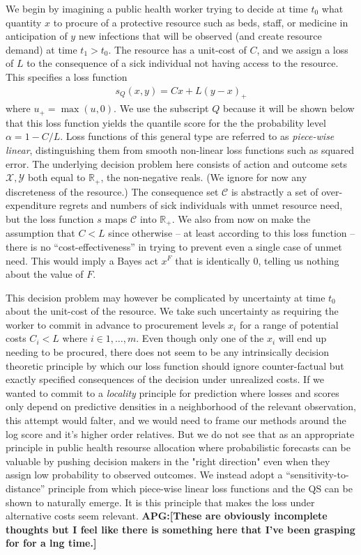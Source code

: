 \documentclass{article}
\def\apg#1{{\color{red}\textbf{APG:[#1]}}}
\begin{document}
We begin by imagining a public health worker trying to decide at time $t_0$ what quantity $x$ to procure of a protective resource such as beds, staff, or medicine in anticipation of $y$ new infections that will be observed (and create resource demand) at time $t_1>t_0$. The resource has a unit-cost of $C$, and we assign a loss of $L$ to the consequence of a sick individual not having access to the resource. This specifies a loss function  
\begin{align}
s_Q(x,y) = Cx + L(y-x)_+ \label{eqn:quantile_loss}
\end{align}
where $u_+ = \max(u,0)$.  We use the subscript $Q$ because it will be shown below that this loss function yields the quantile score for the the probability level $\alpha = 1 - C/L$.  Loss functions of this general type are referred to as \emph{piece-wise linear}, distinguishing them from smooth non-linear loss functions such as squared error.
The underlying decision problem here consists of action and outcome sets $\mathcal{X},\mathcal{Y}$ both equal to $\mathbb{R}_+$, the non-negative reals.  (We ignore for now any discreteness of the resource.) The consequence set $\mathcal{C}$ is abstractly a set of over-expenditure regrets and numbers of sick individuals with unmet resource need, but the loss function $s$ maps $\mathcal{C}$ into $\mathbb{R}_+$. We also from now on make the assumption that $C < L$ since otherwise -- at least according to this loss function -- there is no ``cost-effectiveness'' in trying to prevent even a single case of unmet need. This would imply a Bayes act $x^F$ that is identically 0, telling us nothing about the value of $F$.

This decision problem may however be complicated by uncertainty at time $t_0$ about the unit-cost of the resource. We take such uncertainty as requiring the worker to commit in advance to procurement levels $x_i$ for a range of potential costs $C_i < L$ where $i \in 1, \ldots, m$.  Even though only one of the $x_i$ will end up needing to be procured, there does not seem to be any intrinsically decision theoretic principle by which our loss function should ignore counter-factual but exactly specified consequences of the decision under unrealized costs. If we wanted to commit to a \emph{locality} principle for prediction where losses and scores only depend on predictive densities in a neighborhood of the relevant observation, this attempt would falter, and we would need to frame our methods around the log score and it's higher order relatives. But we do not see that as an appropriate principle in public health resourse allocation where  
probabilistic forecasts can be valuable by pushing decision makers in the "right direction" even when they assign low probability to observed outcomes. We instead adopt a ``sensitivity-to-distance'' principle from which piece-wise linear loss functions and the QS can be shown to naturally emerge. It is this principle that makes the loss under alternative costs seem relevant. \apg{These are obviously incomplete thoughts but I feel like there is something here that I've been grasping for for a lng time.}
\end{document}
